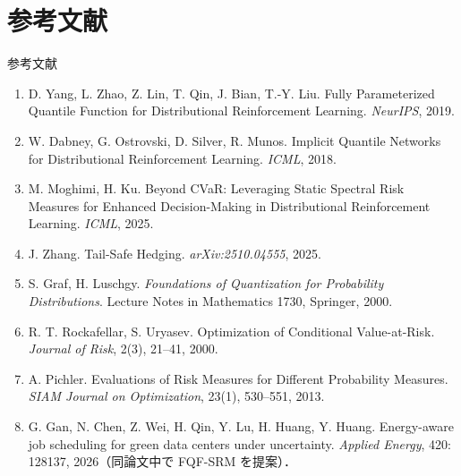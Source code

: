 \documentclass[aspectratio=169, 10pt]{beamer}
\begin{document}
\section{参考文献}
\begin{frame}{参考文献}
  \scriptsize
  \begin{enumerate}
    \setlength{\itemsep}{1pt}
    \item D. Yang, L. Zhao, Z. Lin, T. Qin, J. Bian, T.-Y. Liu.
          Fully Parameterized Quantile Function for Distributional Reinforcement Learning. \textit{NeurIPS}, 2019.
    \item W. Dabney, G. Ostrovski, D. Silver, R. Munos.
          Implicit Quantile Networks for Distributional Reinforcement Learning. \textit{ICML}, 2018.
    \item M. Moghimi, H. Ku. Beyond CVaR: Leveraging Static Spectral Risk Measures for Enhanced Decision-Making in Distributional Reinforcement Learning. \textit{ICML}, 2025.
    \item J. Zhang. Tail-Safe Hedging. \textit{arXiv:2510.04555}, 2025.
    \item S. Graf, H. Luschgy. \textit{Foundations of Quantization for Probability Distributions}. Lecture Notes in Mathematics 1730, Springer, 2000.
    \item R. T. Rockafellar, S. Uryasev. Optimization of Conditional Value-at-Risk. \textit{Journal of Risk}, 2(3), 21--41, 2000.
    \item A. Pichler. Evaluations of Risk Measures for Different Probability Measures. \textit{SIAM Journal on Optimization}, 23(1), 530--551, 2013.
    \item G. Gan, N. Chen, Z. Wei, H. Qin, Y. Lu, H. Huang, Y. Huang. Energy-aware job scheduling for green data centers under uncertainty. \textit{Applied Energy}, 420: 128137, 2026（同論文中で FQF-SRM を提案）．
  \end{enumerate}
\end{frame}
\end{document}
